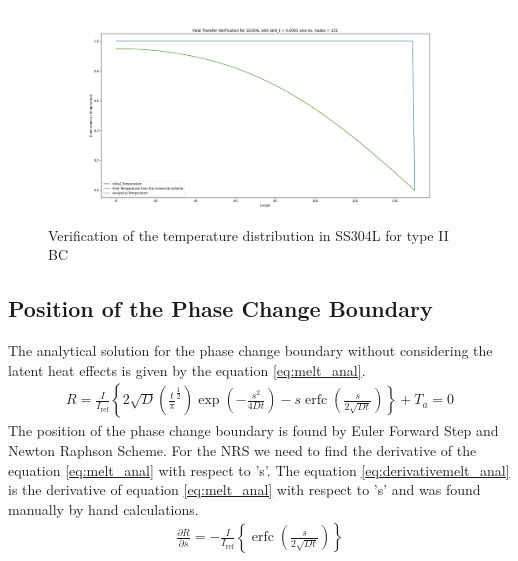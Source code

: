 \begin{figure}[h]
  \centering
  \includegraphics[width=17cm]{img/SS304_T2.png}
  \caption{Verification of the temperature distribution in SS304L for type II BC}
  \label{fig:Type2SS304L}
\end{figure}
\newpage
\subsection{Position of the Phase Change Boundary}
The analytical solution for the phase change boundary without considering the latent heat effects is given by the equation \ref{eq:melt_anal}\cite{verhoeven2003modelling}\cite{pahio(2872)_2015}.
\begin{subequations}
    \begin{align}
        R = \frac{I}{I_{\text{ref}}}\left\{2\sqrt{D}\left(\frac{t}{\pi}^{\frac{1}{2}}\right) \exp\left(-\frac{s^2}{4Dt}\right) - s \operatorname{erfc}\left(\frac{s}{2\sqrt{Dt}}\right)\right\} +T_a = 0 \label{eq:melt_anal}
    \end{align} \label{eq:analytical solution to the position}
\end{subequations}
The position of the phase change boundary is found by Euler Forward Step and Newton Raphson Scheme. For the NRS we need to find the derivative of the equation \ref{eq:melt_anal} with respect to 's'. The equation \ref{eq:derivativemelt_anal} is the derivative of equation \ref{eq:melt_anal} with respect to 's' and was found manually by hand calculations.  
\begin{subequations}
    \begin{align}
       \frac{\partial R}{\partial s} = -\frac{I}{I_{\text{ref}}}\left\{\operatorname{erfc}\left(\frac{s}{2\sqrt{Dt}}\right)\right\} \label{eq:derivativemelt_anal}
    \end{align}
\end{subequations}

